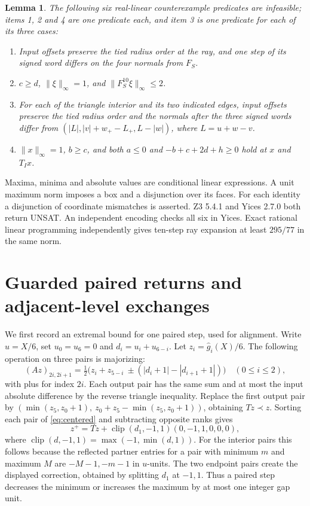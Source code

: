 \documentclass[11pt,reqno]{amsart}
\newtheorem{lemma}[theorem]{Lemma}
\theoremstyle{remark}
\begin{document}
\begin{lemma}\label{lem:radii}
The following six real-linear counterexample predicates are infeasible; items 1, 2 and 4 are one predicate each, and item 3 is one predicate for each of its three cases:
\begin{enumerate}
\item Input offsets preserve the tied radius order at the ray, and one step of its signed word differs on the four normals from \(F_S\).
\item \(c\ge d\), \(\|\xi\|_\infty=1\), and \(\|F_S^{10}\xi\|_\infty\le2\).
\item For each of the triangle interior and its two indicated edges, input offsets preserve the tied radius order and the normals after the three signed words differ from \((|L|,|v|+w_+-L_+,L-|w|)\), where \(L=u+w-v\).
\item \(\|x\|_\infty=1\), \(b\ge c\), and both \(a\le0\) and \(-b+c+2d+h\ge0\) hold at \(x\) and \(T_Ix\).
\end{enumerate}
\end{lemma}

Maxima, minima and absolute values are conditional linear expressions. A unit maximum norm imposes a box and a disjunction over its faces. For each identity a disjunction of coordinate mismatches is asserted. Z3 5.4.1 and Yices 2.7.0 both return UNSAT. An independent encoding checks all six in Yices. Exact rational linear programming independently gives ten-step ray expansion at least \(295/77\) in the same norm.

\section{Guarded paired returns and adjacent-level exchanges}\label{ap:returns}

We first record an extremal bound for one paired step, used for alignment. Write \(u=X/6\), set \(u_0=u_6=0\) and \(d_i=u_i+u_{6-i}\). Let \(z_i=\widehat g_i(X)/6\). The following operation on three pairs is majorizing:
\[
 (Az)_{2i,2i+1}
 =\tfrac12\bigl(z_i+z_{5-i}\ \pm (|d_i+1|-|d_{i+1}+1|)\bigr)
 \quad(0\le i\le2),
\]
with plus for index \(2i\). Each output pair has the same sum and at most the input absolute difference by the reverse triangle inequality. Replace the first output pair by
\((\min(z_5,z_0+1),\ z_0+z_5-\min(z_5,z_0+1))\), obtaining \(Tz\prec z\). Sorting each pair of \eqref{eq:centered} and subtracting opposite ranks gives
\[
 z^+=Tz+\operatorname{clip}(d_1,-1,1)(0,-1,1,0,0,0),
\]
where \(\operatorname{clip}(d,-1,1)=\max(-1,\min(d,1))\).
For the interior pairs this follows because the reflected partner entries for a pair with minimum \(m\) and maximum \(M\) are \(-M-1,-m-1\) in \(u\)-units. The two endpoint pairs create the displayed correction, obtained by splitting \(d_1\) at \(-1,1\). Thus a paired step decreases the minimum or increases the maximum by at most one integer gap unit.
\end{document}
